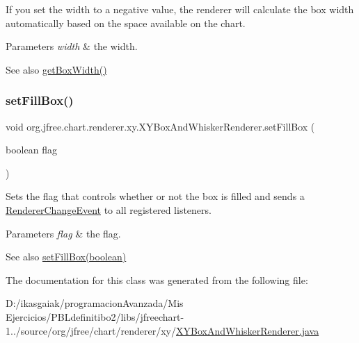 If you set the width to a negative value, the renderer will calculate the box width automatically based on the space available on the chart.


\begin{DoxyParams}{Parameters}
{\em width} & the width.\\
\hline
\end{DoxyParams}
\begin{DoxySeeAlso}{See also}
\mbox{\hyperlink{classorg_1_1jfree_1_1chart_1_1renderer_1_1xy_1_1_x_y_box_and_whisker_renderer_a45c1aed1e263bd3a0078270316a6af6b}{get\+Box\+Width()}} 
\end{DoxySeeAlso}
\mbox{\label{classorg_1_1jfree_1_1chart_1_1renderer_1_1xy_1_1_x_y_box_and_whisker_renderer_adca86c2d9224085f5d51c5d0f2994193}} 
\subsubsection{\texorpdfstring{set\+Fill\+Box()}{setFillBox()}}
{\footnotesize\ttfamily void org.\+jfree.\+chart.\+renderer.\+xy.\+X\+Y\+Box\+And\+Whisker\+Renderer.\+set\+Fill\+Box (\begin{DoxyParamCaption}\item[{boolean}]{flag }\end{DoxyParamCaption})}

Sets the flag that controls whether or not the box is filled and sends a \mbox{\hyperlink{}{Renderer\+Change\+Event}} to all registered listeners.


\begin{DoxyParams}{Parameters}
{\em flag} & the flag.\\
\hline
\end{DoxyParams}
\begin{DoxySeeAlso}{See also}
\mbox{\hyperlink{classorg_1_1jfree_1_1chart_1_1renderer_1_1xy_1_1_x_y_box_and_whisker_renderer_adca86c2d9224085f5d51c5d0f2994193}{set\+Fill\+Box(boolean)}} 
\end{DoxySeeAlso}


The documentation for this class was generated from the following file\+:\begin{DoxyCompactItemize}
\item 
D\+:/ikasgaiak/programacion\+Avanzada/\+Mis Ejercicios/\+P\+B\+Ldefinitibo2/libs/jfreechart-\/1../source/org/jfree/chart/renderer/xy/\mbox{\hyperlink{_x_y_box_and_whisker_renderer_8java}{X\+Y\+Box\+And\+Whisker\+Renderer.\+java}}\end{DoxyCompactItemize}

